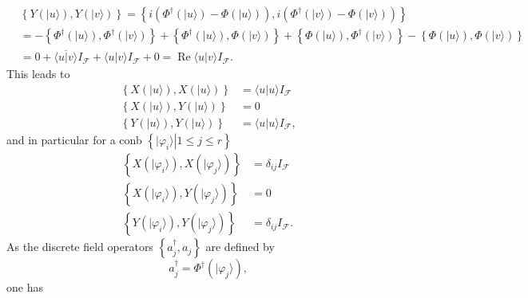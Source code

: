 \documentclass[aps, preprint]{revtex4}
\begin{document}
\begin{align} & \left \{Y \left (\vert u \rangle \right ) ,Y \left (\vert v \rangle \right )\right \} =\left \{i \left (\Phi ^{ \dag } \left (\vert u \rangle \right ) -\Phi  \left (\vert u \rangle \right )\right ) ,i \left (\Phi ^{ \dag } \left (\vert v \rangle \right ) -\Phi  \left (\vert v \rangle \right )\right )\right \} \nonumber  \\
 &  = -\left \{\Phi ^{ \dag } \left (\vert u \rangle \right ) ,\Phi ^{ \dag } \left (\vert v \rangle \right )\right \} +\left \{\Phi ^{ \dag } \left (\vert u \rangle \right ) ,\Phi  \left (\vert v \rangle \right )\right \} +\left \{\Phi  \left (\vert u \rangle \right ) ,\Phi ^{ \dag } \left (\vert v \rangle \right )\right \} -\left \{\Phi  \left (\vert u \rangle \right ) ,\Phi  \left (\vert v \rangle \right )\right \} \nonumber  \\
 &  =0 +\overline{ \langle \left .u\right \vert v \rangle } I_{\mathcal{F}} + \langle \left .u\right \vert v \rangle  I_{\mathcal{F}} +0 =\ensuremath{\operatorname*{Re}}  \langle \left .u\right \vert v \rangle  I_{\mathcal{F}}\text{.}\end{align}This leads to
\begin{align}\left \{X \left (\vert u \rangle \right ) ,X \left (\vert u \rangle \right )\right \} &  = \langle \left .u\right \vert u \rangle  I_{\mathcal{F}} \\
\left \{X \left (\vert u \rangle \right ) ,Y \left (\vert u \rangle \right )\right \} &  =0 \\
\left \{Y \left (\vert u \rangle \right ) ,Y \left (\vert u \rangle \right )\right \} &  = \langle \left .u\right \vert u \rangle  I_{\mathcal{F}}\text{,}\end{align}and in particular for a conb $\left \{\left .\vert \varphi _{i} \rangle \right \vert 1 \leq j \leq r\right \}$
\begin{align}\left \{X \left (\vert \varphi _{i} \rangle \right ) ,X \left (\vert \varphi _{j} \rangle \right )\right \} &  =\delta _{i j} I_{\mathcal{F}} \\
\left \{X \left (\vert \varphi _{i} \rangle \right ) ,Y \left (\vert \varphi _{j} \rangle \right )\right \} &  =0 \\
\left \{Y \left (\vert \varphi _{i} \rangle \right ) ,Y \left (\vert \varphi _{j} \rangle \right )\right \} &  =\delta _{i j} I_{\mathcal{F}}\text{.}\end{align}As the discrete field operators $\left \{a_{j}^{ \dag } ,a_{j}\right \}$ are defined by
\begin{equation}a_{j}^{ \dag } =\Phi ^{ \dag } \left (\vert \varphi _{j} \rangle \right )\text{,}
\end{equation}one has
\end{document}
